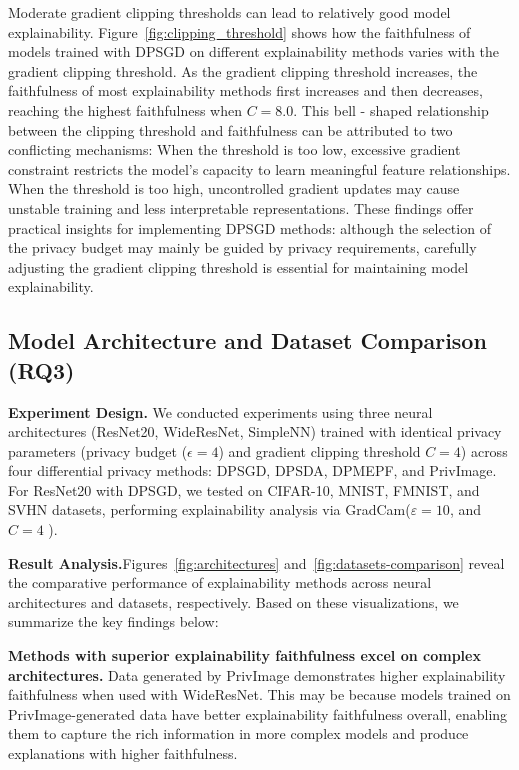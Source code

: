 \documentclass{article}
\begin{document}
Moderate gradient clipping thresholds can lead to relatively good model explainability. Figure~\ref{fig:clipping_threshold} shows how the faithfulness of models trained with DPSGD on different explainability methods varies with the gradient clipping threshold. As the gradient clipping threshold increases, the faithfulness of most explainability methods first increases and then decreases, reaching the highest faithfulness when $C = 8.0$. This bell - shaped relationship between the clipping threshold and faithfulness can be attributed to two conflicting mechanisms: When the threshold is too low, excessive gradient constraint restricts the model's capacity to learn meaningful feature relationships. When the threshold is too high, uncontrolled gradient updates may cause unstable training and less interpretable representations. These findings offer practical insights for implementing DPSGD methods: although the selection of the privacy budget may mainly be guided by privacy requirements, carefully adjusting the gradient clipping threshold is essential for maintaining model explainability.

\subsection{Model Architecture and Dataset Comparison (RQ3)}

\noindent \textbf{Experiment Design.}
We conducted experiments using three neural architectures (ResNet20, WideResNet, SimpleNN) trained with identical privacy parameters (privacy budget ($\epsilon=4$) and gradient clipping threshold $C=4$) across four differential privacy methods: DPSGD, DPSDA, DPMEPF, and PrivImage. For ResNet20 with DPSGD, we tested on CIFAR-10, MNIST, FMNIST, and SVHN datasets, performing explainability analysis via GradCam($\varepsilon = 10$, and $C=4$ ). 

\noindent \textbf{Result Analysis.}Figures~\ref{fig:architectures} and~\ref{fig:datasets-comparison} reveal the comparative performance of explainability methods across neural architectures and datasets, respectively. Based on these visualizations, we summarize the key findings below:

\noindent \textbf{Methods with superior explainability faithfulness excel on complex architectures. }Data generated by PrivImage demonstrates higher explainability faithfulness when used with WideResNet. This may be because models trained on PrivImage-generated data have better explainability faithfulness overall, enabling them to capture the rich information in more complex models and produce explanations with higher faithfulness.
\end{document}
